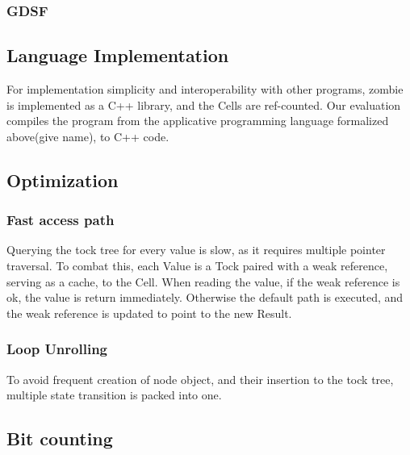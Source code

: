 \subsubsection{GDSF}
\subsection{Language Implementation}
For implementation simplicity and interoperability with other programs, zombie is implemented as a C++ library, and the Cells are ref-counted. Our evaluation compiles the program from the applicative programming language formalized above(give name), to C++ code.
\subsection{Optimization}
\subsubsection{Fast access path}
Querying the tock tree for every value is slow, as it requires multiple pointer traversal.
To combat this, each Value is a Tock paired with a weak reference, serving as a cache, to the Cell. When reading the value, if the weak reference is ok, the value is return immediately. Otherwise the default path is executed, and the weak reference is updated to point to the new Result.
\subsubsection{Loop Unrolling}
To avoid frequent creation of node object, and their insertion to the tock tree, multiple state transition is packed into one.
\subsection{Bit counting}